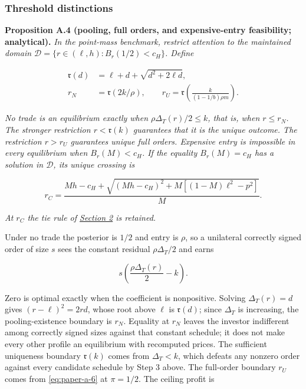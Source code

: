 
\subsubsection{Threshold distinctions}\label{threshold-distinctions}

\protect{}\label{result-proposition-a-4}{\textbf{Proposition
A.4 (pooling, full orders, and expensive-entry feasibility;
analytical).}} \emph{In the point-mass benchmark, restrict attention to
the maintained domain
\(\mathcal D=\{r\in(\ell,h):B_r(1/2)<c_H\}\). Define}

\[
\begin{aligned}
\mathfrak r(d)&=\ell+d+\sqrt{d^2+2\ell d},\\
r_N&=\mathfrak r(2k/\rho),\qquad
r_U=\mathfrak r\left(\frac{k}{(1-1/b)\rho m}\right).
\end{aligned}
\tag{A.10}\label{eq:paper-a-10}
\]

\emph{No trade is an equilibrium exactly when
\(\rho\Delta_T(r)/2\le k\), that is, when \(r\le r_N\). The stronger
restriction \(r<\mathfrak r(k)\) guarantees that it is the unique
outcome. The restriction \(r>r_U\) guarantees unique full orders.
Expensive entry is impossible in every equilibrium when \(B_r(M)<c_H\).
If the equality \(B_r(M)=c_H\) has a solution in \(\mathcal D\), its
unique crossing is}

\[
r_C=\frac{Mh-c_H+\sqrt{(Mh-c_H)^2+M[(1-M)\ell^2-p^2]}}{M}.
\tag{A.11}\label{eq:paper-a-11}
\]

\emph{At \(r_C\) the tie rule of \hyperref[sec-model]{Section 2} is
retained.}

Under no trade the posterior is \(1/2\) and entry is \(\rho\), so a
unilateral correctly signed order of size \(s\) sees the constant
residual \(\rho\Delta_T/2\) and earns

\[
s\left(\frac{\rho\Delta_T(r)}{2}-k\right).
\tag{A.12}\label{eq:paper-a-12}
\]

Zero is optimal exactly when the coefficient is nonpositive. Solving
\(\Delta_T(r)=d\) gives \((r-\ell)^2=2rd\), whose root above \(\ell\) is
\(\mathfrak r(d)\); since \(\Delta_T\) is increasing, the
pooling-existence boundary is \(r_N\). Equality at \(r_N\) leaves the
investor indifferent among correctly signed sizes against that constant
schedule; it does not make every other profile an equilibrium with
recomputed prices. The sufficient uniqueness boundary \(\mathfrak r(k)\)
comes from \(\Delta_T<k\), which defeats any nonzero order against every
candidate schedule by Step 3 above. The full-order boundary \(r_U\)
comes from \eqref{eq:paper-a-6} at \(\pi=1/2\). The ceiling profit is

